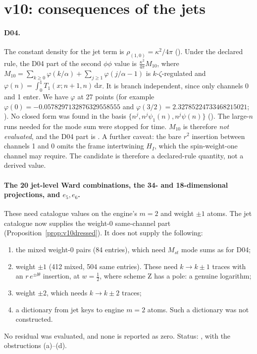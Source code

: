 \section{v10: consequences of the jets}
\label{sec:v10conseq}

\paragraph{D04.}
The constant density for the jet term is
\(\rho_{(1,0)}=\kappa^2/4\pi\) ().
Under the declared rule, the D04 part of the second \(\phi\phi\)
value is
\(\tfrac{\kappa^2}{4\pi}M_{10}\), where
\(M_{10}=\sum_{k\ge0}\varphi(k/\alpha)+\sum_{j\ge1}\varphi(j/\alpha-1)\)
is \(k\)-\(\zeta\)-regulated and \(\varphi(n)=\int_0^1T_1(x;n+1,n)\,\mathrm dx\).
It is branch independent, since only channels 0 and 1 enter. We
have \(\varphi\) at 27 points (for example
\(\varphi(0)=-0.0578297132876329558555\) and
\(\varphi(3/2)=2.32785224733468215021\);
). No closed form was found in the basis
\(\{n^j,n^j\psi_1(n),n^j\psi(n)\}\) (). The
large-\(n\) runs needed for the mode sum were stopped for time.
\(M_{10}\) is therefore \emph{not evaluated}, and the D04 part is
\PARTIAL. A further caveat: the bare \(r^2\) insertion between
channels 1 and 0 omits the frame intertwining \(H_I\), which the
spin-weight-one channel may require. The candidate is therefore a
declared-rule quantity, not a derived value.

\paragraph{The 20 jet-level Ward combinations, the 34- and 18-dimensional
projections, and \(e_5,e_6\).}
These need catalogue values on the engine's \(m=2\) and weight
\(\pm1\) atoms. The jet catalogue now supplies the weight-0
same-channel part (Proposition~\ref{prop:v10dressed}). It does not
supply the following:
\begin{enumerate}[label=(\alph*)]
\item the mixed weight-0 pairs (84 entries), which need \(M_{st}\)
mode sums as for D04;
\item weight \(\pm1\) (412 mixed, 504 same entries). These need
\(k\to k\pm1\) traces with an \(r\,e^{\pm\ii\theta}\) insertion, at
\(w=\tfrac12\), where scheme Z has a pole: a genuine
logarithm;
\item weight \(\pm2\), which needs \(k\to k\pm2\) traces;
\item a dictionary from jet keys to engine \(m=2\) atoms. Such a
dictionary was not constructed.
\end{enumerate}
No residual was evaluated, and none is reported as zero. Status:
\OPEN, with the obstructions (a)--(d).

